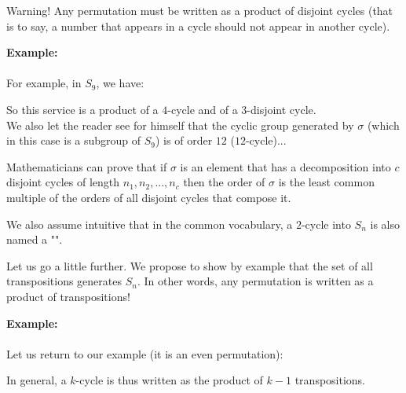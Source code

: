 \begin{enumerate}
		Warning! Any permutation must be written as a product of disjoint cycles (that is to say, a number that appears in a cycle should not appear in another cycle).
		
		\begin{tcolorbox}[colframe=black,colback=white,sharp corners]
		\textbf{{\Large {}}Example:}\\\\
		For example, in $S_9$, we have:
		
		So this service is a product of a $4$-cycle and of a $3$-disjoint cycle.\\
		
		We also let the reader see for himself that the cyclic group generated by $\sigma$ (which in this case is a subgroup of $S_9$) is of order $12$ ($12$-cycle)...
		\end{tcolorbox}
		\begin{tcolorbox}[title=Remark,colframe=black,arc=10pt]
		Mathematicians can prove that if $\sigma$ is an element that has a decomposition into $c$ disjoint cycles of length $n_1,n_2,...,n_c$ then the order of $\sigma$ is the least common multiple of the orders of all disjoint cycles that compose it.
		\end{tcolorbox}	
	\end{enumerate} 
	We also assume intuitive that in the common vocabulary, a $2$-cycle into $S_n$ is also named a "".
	
	Let us go a little further. We propose to show by example that the set of all transpositions generates $S_n$. In other words, any permutation is written as a product of transpositions!
	
	\begin{tcolorbox}[colframe=black,colback=white,sharp corners]
	\textbf{{\Large {}}Example:}\\\\
	Let us return to our example (it is an even permutation):
		
	\end{tcolorbox}
	In general, a $k$-cycle is thus written as the product of $k-1$ transpositions.
	
